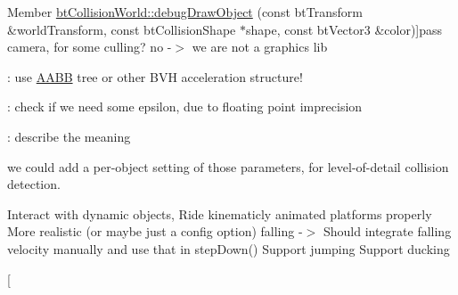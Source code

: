 \begin{DoxyRefList}
Member \hyperlink{classbt_collision_world_ac1ca6489c220005798069152c3df0d08}{bt\+Collision\+World\+:\+:debug\+Draw\+Object} (const bt\+Transform \&world\+Transform, const bt\+Collision\+Shape $\ast$shape, const bt\+Vector3 \&color)]pass camera, for some culling? no -\/$>$ we are not a graphics lib  
\item[\label{todo__todo000020}%
\hypertarget{todo__todo000020}{}%
Member \hyperlink{classbt_collision_world_a2312e2da71f0d7646a4dc19a4966bed0}{bt\+Collision\+World\+:\+:object\+Query\+Single\+Internal} (const bt\+Convex\+Shape $\ast$cast\+Shape, const bt\+Transform \&convex\+From\+Trans, const bt\+Transform \&convex\+To\+Trans, const \hyperlink{structbt_collision_object_wrapper}{bt\+Collision\+Object\+Wrapper} $\ast$col\+Obj\+Wrap, Convex\+Result\+Callback \&result\+Callback, bt\+Scalar allowed\+Penetration)]\+: use \hyperlink{class_a_a_b_b}{A\+A\+B\+B} tree or other B\+V\+H acceleration structure!  
\item[\label{todo__todo000024}%
\hypertarget{todo__todo000024}{}%
Member \hyperlink{structbt_connectivity_processor_a5d5f11a5ad2bc3b3bfad6882b42e18de}{bt\+Connectivity\+Processor\+:\+:process\+Triangle} (bt\+Vector3 $\ast$triangle, int part\+Id, int triangle\+Index)]\+: check if we need some epsilon, due to floating point imprecision  
\item[\label{todo__todo000022}%
\hypertarget{todo__todo000022}{}%
Class \hyperlink{classbt_default_collision_configuration}{bt\+Default\+Collision\+Configuration} ]\+: describe the meaning  
\item[\label{todo__todo000023}%
\hypertarget{todo__todo000023}{}%
Member \hyperlink{classbt_default_collision_configuration_a39a173eedf0e8d55dd89ef3b637925a9}{bt\+Default\+Collision\+Configuration\+:\+:set\+Convex\+Convex\+Multipoint\+Iterations} (int num\+Perturbation\+Iterations=3, int minimum\+Points\+Perturbation\+Threshold=3)]we could add a per-\/object setting of those parameters, for level-\/of-\/detail collision detection.  
\item[\label{todo__todo000037}%
\hypertarget{todo__todo000037}{}%
Class \hyperlink{classbt_kinematic_closest_not_me_ray_result_callback}{bt\+Kinematic\+Closest\+Not\+Me\+Ray\+Result\+Callback} ]Interact with dynamic objects, Ride kinematicly animated platforms properly More realistic (or maybe just a config option) falling -\/$>$ Should integrate falling velocity manually and use that in step\+Down() Support jumping Support ducking  
\item[\label{todo__todo000025}%
\hypertarget{todo__todo000025}{}%

\end{DoxyRefList}
